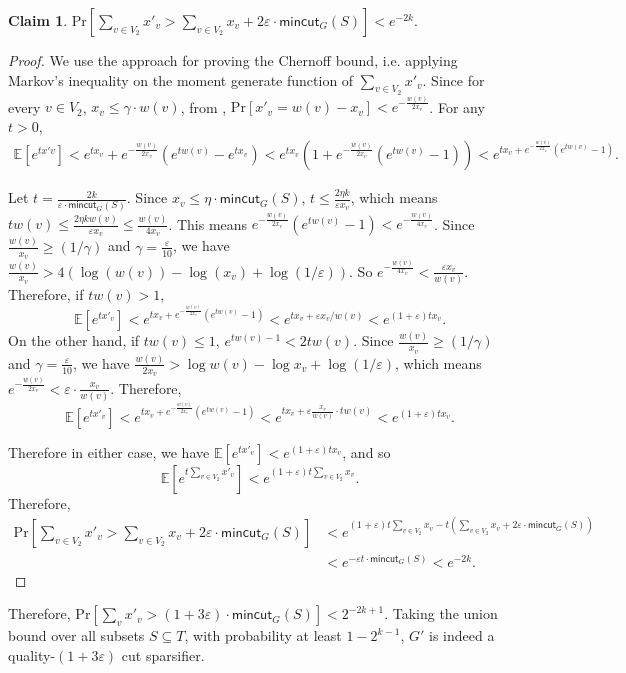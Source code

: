 \documentclass[11pt]{article}
\theoremstyle{definition}
\newtheorem{claim}[theorem]{Claim}
\newcommand{\eps}{{\varepsilon}}
\def\pr#1{\mathrm{Pr}\left[ #1 \right]}
\def\ex#1{{\mathbb{E}}\left[ #1 \right]}
\newcommand{\mc}{\mathsf{mincut}}
\begin{document}
\begin{claim}
$\pr{\sum_{v\in V_2} x'_v > \sum_{v\in V_2} x_v + 2\eps\cdot \mc_G(S)} <e^{-2k}$.
\end{claim}
\begin{proof}
We use the approach for proving the Chernoff bound, i.e. applying Markov's inequality on the moment generate function of $\sum_{v \in V_2} x'_v$. Since for every $v \in V_2$, $x_v \le \gamma \cdot w(v)$, from , $\pr{x'_v = w(v)-x_v} < e^{-\frac{w(v)}{2x_v}}$. For any $t>0$, 
\begin{align*}
\ex{e^{tx'v}} < e^{tx_v} + e^{-\frac{w(v)}{2x_v}}(e^{tw(v)}-e^{tx_v}) < e^{tx_v}(1+e^{-\frac{w(v)}{2x_v}}(e^{tw(v)}-1)) < e^{tx_v + e^{-\frac{w(v)}{2x_v}}(e^{tw(v)}-1)}.
\end{align*}

Let $t = \frac{2k}{\eps \cdot\mc_G(S)}$. Since $x_v \le \eta \cdot\mc_G(S)$, $t \le \frac{2 \eta k}{\eps x_v}$, which means $tw(v) \le \frac{2\eta k w(v)}{\eps x_v} \le \frac{w(v)}{4x_v}$. This means $e^{-\frac{w(v)}{2x_v}}(e^{tw(v)}-1)< e^{-\frac{w(v)}{4x_v}}$. Since $\frac{w(v)}{x_v} \ge (1/\gamma)$ and $\gamma=\frac{\eps}{10}$, we have $\frac{w(v)}{x_v}>4( \log (w(v))-\log(x_v) + \log (1/\eps))$. So $e^{-\frac{w(v)}{4x_v}}<\frac{\eps x_v}{w(v)}$. Therefore, if $tw(v) > 1$,
$$
\ex{e^{tx'_v}}<e^{tx_v + e^{-\frac{w(v)}{2x_v}}(e^{tw(v)}-1)}<e^{tx_v + \eps x_v/w(v)}<e^{(1+\eps)tx_v}.
$$
On the other hand, if $tw(v) \le 1$, $e^{tw(v)-1} < 2tw(v)$. Since $\frac{w(v)}{x_v} \ge (1/\gamma)$ and $\gamma=\frac{\eps}{10}$, we have $\frac{w(v)}{2x_v} > \log w(v) - \log x_v + \log (1/\eps)$, which means $e^{-\frac{w(v)}{2x_v}}<\eps\cdot \frac{x_v}{w(v)}$. Therefore,
$$
\ex{e^{tx'_v}}<e^{tx_v + e^{-\frac{w(v)}{2x_v}}(e^{tw(v)}-1)}<e^{tx_v + \eps\frac{x_v}{w(v)} \cdot tw(v)} < e^{(1+\eps)tx_v}.
$$

Therefore in either case, we have $\ex{e^{tx'_v}}<e^{(1+\eps)tx_v}$, and so
$$\ex{e^{t\sum_{v\in V_2} x'_v}} < e^{(1+\eps)t\sum_{v\in V_2} x_v}.$$ 
Therefore,
\[
\begin{split}
\pr{\sum_{v\in V_2} x'_v > \sum_{v\in V_2} x_v + 2\eps \cdot\mc_G(S)} & < e^{(1+\eps)t\sum_{v\in V_2} x_v-t(\sum_{v \in V_2} x_v + 2\eps \cdot\mc_G(S))}\\
& < e^{-\eps t \cdot\mc_G(S)}<e^{-2k}.
\end{split}
\]
\end{proof}

Therefore, $\pr{\sum_v x'_v > (1+3\eps)\cdot\mc_G(S)} < 2^{-2k+1}$. Taking the union bound over all subsets $S\subseteq T$, with probability at least $1-2^{k-1}$, $G'$ is indeed a quality-$(1+3\eps)$ cut sparsifier.
\end{document}
